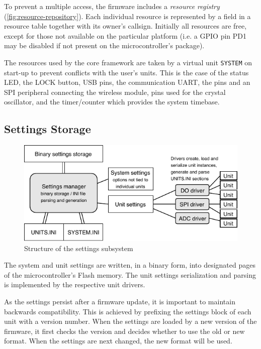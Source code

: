 To prevent a multiple access, the firmware includes a \textit{resource registry} (\cref{fig:resource-repository}). Each individual resource is represented by a field in a resource table together with its owner's callsign. Initially all resources are free, except for those not available on the particular platform (i.e. a GPIO pin PD1 may be disabled if not present on the microcontroller's package).

The resources used by the core framework are taken by a virtual unit \verb|SYSTEM| on start-up to prevent conflicts with the user's units. This is the case of the status \gls{LED}, the LOCK button, \gls{USB} pins, the communication \gls{UART}, the pins and an \gls{SPI} peripheral connecting the wireless module, pins used for the crystal oscillator, and the timer/counter which provides the system timebase.


\subsection{Settings Storage} \label{sec:settings-storage}

\begin{figure}[h]
	\centering
	\includegraphics[scale=1] {img/settings-storage.pdf}
	\caption{\label{fig:settings-storage}Structure of the settings subsystem}
\end{figure}

The system and unit settings are written, in a binary form, into designated pages of the microcontroller's Flash memory. The unit settings serialization and parsing is implemented by the respective unit drivers.

As the settings persist after a firmware update, it is important to maintain backwards compatibility. This is achieved by prefixing the settings block of each unit with a version number. When the settings are loaded by a new version of the firmware, it first checks the version and decides whether to use the old or new format. When the settings are next changed, the new format will be used.

